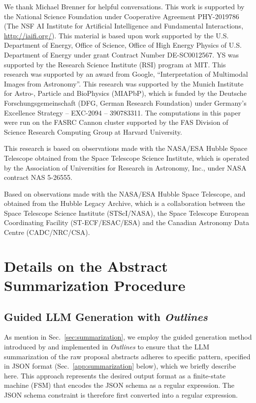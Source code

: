 \documentclass[10pt]{article} %
\newcommand{\package}[1]{\textsl{#1}\xspace}
\begin{document}
We thank Michael Brenner for helpful conversations.
%
This work is supported by the National Science Foundation under Cooperative Agreement PHY-2019786 (The NSF AI Institute for Artificial Intelligence and Fundamental Interactions, \url{http://iaifi.org/}).
%
This material is based upon work supported by the U.S. Department of Energy, Office of Science, Office of High Energy Physics of U.S. Department of Energy under grant Contract Number  DE-SC0012567. 
%
YS was supported by the Research Science Institute (RSI) program at MIT.
%
This research was supported by an award from Google,  ``Interpretation of Multimodal Images from Astronomy''.
%
This research was supported by the Munich Institute for Astro-, Particle and BioPhysics (MIAPbP), which is funded by the Deutsche Forschungsgemeinschaft (DFG, German Research Foundation) under Germany's Excellence Strategy – EXC-2094 – 390783311.
%
The computations in this paper were run on the FASRC Cannon cluster supported by the FAS Division of Science Research Computing Group at Harvard University.

This research is based on observations made with the NASA/ESA Hubble Space Telescope obtained from the Space Telescope Science Institute, which is operated by the Association of Universities for Research in Astronomy, Inc., under NASA contract NAS 5-26555.

Based on observations made with the NASA/ESA Hubble Space Telescope, and obtained from the Hubble Legacy Archive, which is a collaboration between the Space Telescope Science Institute (STScI/NASA), the Space Telescope European Coordinating Facility (ST-ECF/ESAC/ESA) and the Canadian Astronomy Data Centre (CADC/NRC/CSA).





\appendix

\section{Details on the Abstract Summarization Procedure}

\subsection{Guided LLM Generation with \package{Outlines}}
\label{app:guided-generation}

As mention in Sec.~\ref{sec:summarization}, we employ the guided generation method introduced by \citet{willard2023efficient} and implemented in \package{Outlines} to ensure that the LLM summarization of the raw proposal abstracts adheres to specific pattern, specified in JSON format (Sec.~\ref{app:summarization} below), which we briefly describe here. This approach represents the desired output format as a finite-state machine (FSM) that encodes the JSON schema as a regular expression. The JSON schema constraint is therefore first converted into a regular expression.
\end{document}
